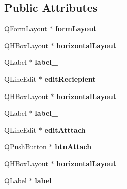 \subsection*{Public Attributes}
\begin{DoxyCompactItemize}
\item 
\hypertarget{class_ui__smtp_aa6c49833905445b16e29aba76c4b12c0}{Q\+Form\+Layout $\ast$ {\bfseries form\+Layout}}\label{class_ui__smtp_aa6c49833905445b16e29aba76c4b12c0}

\item 
\hypertarget{class_ui__smtp_a2721b9c6dac63b98d8f6099a2684bbf8}{Q\+H\+Box\+Layout $\ast$ {\bfseries horizontal\+Layout\+\_}}\label{class_ui__smtp_a2721b9c6dac63b98d8f6099a2684bbf8}

\item 
\hypertarget{class_ui__smtp_ad8fe61962ede90f139c2a283c032e8ac}{Q\+Label $\ast$ {\bfseries label\+\_}}\label{class_ui__smtp_ad8fe61962ede90f139c2a283c032e8ac}

\item 
\hypertarget{class_ui__smtp_a652706086e6fc0200128d5942d82762e}{Q\+Line\+Edit $\ast$ {\bfseries edit\+Reciepient}}\label{class_ui__smtp_a652706086e6fc0200128d5942d82762e}

\item 
\hypertarget{class_ui__smtp_aee8052da9d300171992b9a2bcd697435}{Q\+H\+Box\+Layout $\ast$ {\bfseries horizontal\+Layout\+\_}}\label{class_ui__smtp_aee8052da9d300171992b9a2bcd697435}

\item 
\hypertarget{class_ui__smtp_aa936a56d7c11604c63425406920ba9e0}{Q\+Label $\ast$ {\bfseries label\+\_}}\label{class_ui__smtp_aa936a56d7c11604c63425406920ba9e0}

\item 
\hypertarget{class_ui__smtp_a515f88c38107162c5c423cc72766b6df}{Q\+Line\+Edit $\ast$ {\bfseries edit\+Atttach}}\label{class_ui__smtp_a515f88c38107162c5c423cc72766b6df}

\item 
\hypertarget{class_ui__smtp_a547c6ea3e74be68e3cebe55055d01118}{Q\+Push\+Button $\ast$ {\bfseries btn\+Attach}}\label{class_ui__smtp_a547c6ea3e74be68e3cebe55055d01118}

\item 
\hypertarget{class_ui__smtp_a25c8e868a50fa04f16dc3efb564f960e}{Q\+H\+Box\+Layout $\ast$ {\bfseries horizontal\+Layout\+\_}}\label{class_ui__smtp_a25c8e868a50fa04f16dc3efb564f960e}

\item 
\hypertarget{class_ui__smtp_a711418ca1142a6b136e2d36731c8678c}{Q\+Label $\ast$ {\bfseries label\+\_}}\label{class_ui__smtp_a711418ca1142a6b136e2d36731c8678c}


\end{DoxyCompactItemize}
